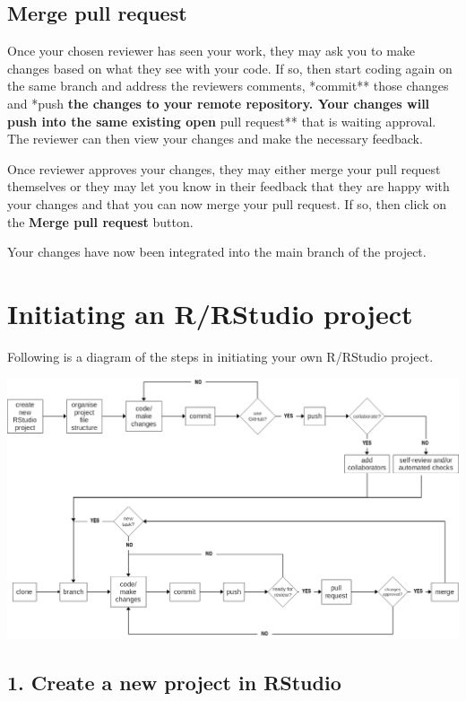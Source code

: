 \documentclass[
  12pt,
]{book}
\begin{document}
\hypertarget{merge-pull-request}{%
\section{Merge pull request}\label{merge-pull-request}}

Once your chosen reviewer has seen your work, they may ask you to make changes based on what they see with your code. If so, then start coding again on the same branch and address the reviewers comments, *commit** those changes and *push\textbf{ the changes to your remote repository. Your changes will push into the same existing open }pull request** that is waiting approval. The reviewer can then view your changes and make the necessary feedback.

Once reviewer approves your changes, they may either merge your pull request themselves or they may let you know in their feedback that they are happy with your changes and that you can now merge your pull request. If so, then click on the \textbf{Merge pull request} button.

Your changes have now been integrated into the main branch of the project.

\hypertarget{initiate-projects}{%
\chapter{Initiating an R/RStudio project}\label{initiate-projects}}

Following is a diagram of the steps in initiating your own R/RStudio project.

\includegraphics{images/git_process2.png}

\hypertarget{create-a-new-project-in-rstudio}{%
\section{1. Create a new project in RStudio}\label{create-a-new-project-in-rstudio}}
\end{document}
